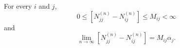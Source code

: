 For every $i$ and $j$,
$$0 \leq [N_{jj}^{(n)} - N_{ij}^{(n)}] \leq M_{ij} < \infty$$
and
$$\lim_{n \to \infty} [N_{jj}^{(n)} - N_{ij}^{(n)}] = M_{ij}\alpha_j.$$
